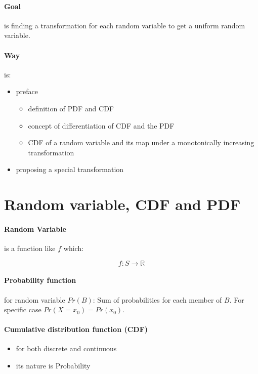 \documentclass[a4paper]{article}
\begin{document}
\paragraph*{Goal}
is finding a transformation for each random variable to get a uniform random
variable.
\paragraph*{Way} is:
\begin{itemize}
    \item preface
        \begin{itemize}
            \item definition of PDF and CDF
            \item concept of differentiation of CDF and the PDF
            \item CDF of a random variable and its map under a monotonically increasing
            transformation 
        \end{itemize}
    \item proposing a special transformation
\end{itemize}

\pagebreak

\section{Random variable, CDF and PDF}

\paragraph*{Random Variable} is a function like $f$ which:

$$f: S \rightarrow \mathbb{R}$$

\paragraph*{Probability function} for random variable $Pr(B)$: Sum of probabilities for each
member of $B$.
For specific case $Pr(X=x_0) = Pr(x_0)$.

\paragraph*{Cumulative distribution function (CDF)}

\begin{itemize}
    \item for both discrete and continuous 
    \item its nature is Probability
\end{itemize}
\end{document}

